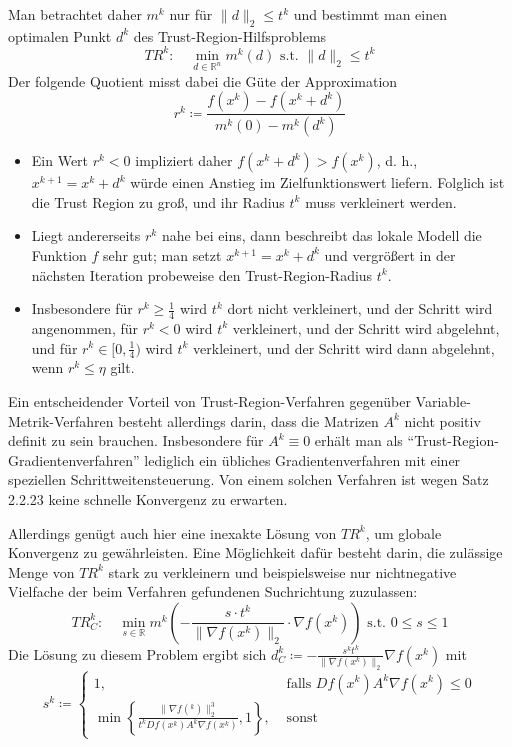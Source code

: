 \documentclass[11pt]{scrreprt}
\theoremstyle{thmstyle}
\numberwithin{thm}{section}
\begin{document}
Man betrachtet daher $m^k$ nur für $\| d \|_2 \leq t^k$ und bestimmt man einen optimalen Punkt $d^k$ des Trust-Region-Hilfsproblems
$$ TR^k: \quad \min_{d \in \mathbb{R}^n} m^k(d) \text{ s.t. } \| d \|_2 \leq t^k $$
Der folgende Quotient misst dabei die Güte der Approximation
$$ r^k \coloneqq \frac{f(x^k) - f(x^k + d^k)}{m^k(0)- m^k(d^k)} $$

\begin{itemize}
	\item Ein Wert $r^k < 0$ impliziert daher $f (x^k + d^k) > f (x^k)$, d. h., $x^{k+1} = x^k + d^k$ würde einen Anstieg im Zielfunktionswert liefern. Folglich ist die Trust Region zu groß, und ihr Radius $t^k$ muss verkleinert werden.
	\item Liegt andererseits $r^k$ nahe bei eins, dann beschreibt das lokale Modell die Funktion $f$ sehr gut; man setzt $x^{k+1} = x^k + d^k$ und vergrößert in der nächsten Iteration probeweise den Trust-Region-Radius $t^k$.
	\item Insbesondere für $r^k \geq \frac{1}{4}$ wird $t^k$ dort nicht verkleinert, und der Schritt wird angenommen, für $r^k < 0$ wird $t^k$ verkleinert, und der Schritt wird abgelehnt, und für $r^k \in [0, \frac{1}{4})$ wird $t^k$ verkleinert, und der Schritt wird dann abgelehnt, wenn $r^k \leq \eta$ gilt.
\end{itemize}

Ein entscheidender Vorteil von Trust-Region-Verfahren gegenüber Variable-Metrik-Verfahren besteht allerdings darin, dass die Matrizen $A^k$ nicht positiv definit zu sein brauchen. Insbesondere für $A^k \equiv 0$ erhält man als \enquote{Trust-Region-Gradientenverfahren} lediglich ein übliches Gradientenverfahren mit einer speziellen Schrittweitensteuerung. Von einem solchen Verfahren ist wegen Satz 2.2.23 keine schnelle Konvergenz zu erwarten. ~\bigskip

 Allerdings genügt auch hier eine inexakte Lösung von $TR^k$, um globale Konvergenz zu gewährleisten. Eine Möglichkeit dafür besteht darin, die zulässige Menge von $TR^k$ stark zu verkleinern und beispielsweise nur nichtnegative Vielfache der beim Verfahren gefundenen Suchrichtung zuzulassen:
$$ TR_C^k: \quad \min_{s \in \mathbb{R}} m^k \left( - \frac{s \cdot t^k}{\| \nabla f(x^k) \|_2} \cdot \nabla f(x^k) \right) \text{ s.t. } 0 \leq s \leq 1 $$
Die Lösung zu diesem Problem ergibt sich $d_C^k \coloneqq - \frac{s^k t^k}{\| \nabla f(x^k) \|_2} \nabla f(x^k)$ mit
$$ s^k \coloneqq \begin{cases} 1, & \text{ falls } Df(x^k) A^k \nabla f(x^k)\leq 0 \\ \min \left\{ \frac{\| \nabla f(^k) \|_2^3}{t^k Df(x^k) A^k \nabla f(x^k)}, 1 \right\}, & \text{ sonst} \end{cases} $$
\end{document}

